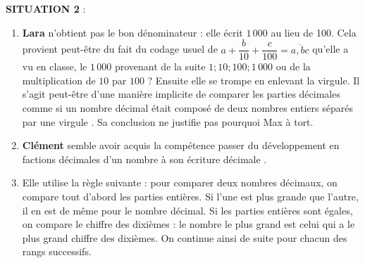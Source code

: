 {\bf SITUATION 2 }: \\
\begin{enumerate}
   \item {\bf Lara} n'obtient pas le bon dénominateur : elle écrit $1\,000$ au lieu de 100. Cela provient peut-être du fait du codage usuel de $a+\dfrac{b}{10}+\dfrac{c}{100} =\overline{a,bc}$ qu'elle a vu en classe, le $1\,000$ provenant de la suite $1 ; 10 ; 100 ; 1\,000$ ou de la multiplication de $10$ par $100$ ? Ensuite elle se trompe en enlevant la virgule. Il s'agit peut-être d'une manière implicite de comparer les parties décimales \og comme si un nombre décimal était composé de deux nombres entiers séparés par une virgule \fg. Sa conclusion ne justifie pas pourquoi Max à tort.
   \item {\bf Clément} semble avoir acquis la compétence \og passer du développement en factions décimales d'un nombre à son écriture décimale \fg.
   \item Elle utilise la règle suivante : pour comparer deux nombres décimaux, on compare tout d'abord les parties entières. Si l'une est plus grande que l'autre, il en est de même pour le nombre décimal. Si les parties entières sont égales, on compare le chiffre des dixièmes : le nombre le plus grand est celui qui a le plus grand chiffre des dixièmes. On continue ainsi de suite pour chacun des rangs successifs.
\end{enumerate}
